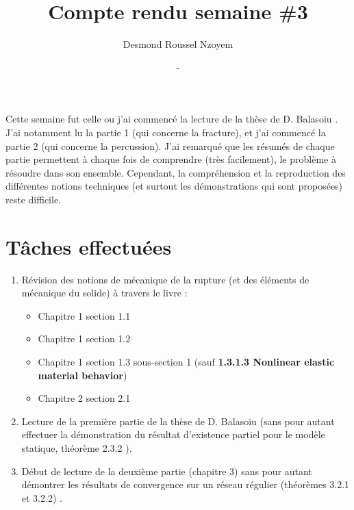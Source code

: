 \documentclass[
  french,
	11pt, %
]{fphw}
\title{Compte rendu semaine \#3} %
\author{Desmond Roussel Nzoyem} %
\date{\DTMdisplaydate{2021}{2}{17}{-1} - \DTMdisplaydate{2021}{2}{23}{-1}} %
\institute{Sorbonne Université \\ Laboratoire Jacques-Louis Lions} %
\begin{document}
\maketitle %



Cette semaine fut celle ou j'ai commencé la lecture de la thèse de D. Balasoiu \parencite{balasoiu2020thesis,balasoiu2020halthesis}. J'ai notamment lu la partie 1 (qui concerne la fracture), et j'ai commencé la partie 2 (qui concerne la percussion). J'ai remarqué que les résumés de chaque partie permettent à chaque fois de comprendre (très facilement), le problème à résoudre dans son ensemble. Cependant, la compréhension et la reproduction des différentes notions techniques (et surtout les démonstrations qui sont proposées) reste difficile.



\section{Tâches effectuées}

\begin{enumerate}
  \item Révision des notions de mécanique de la rupture (et des éléments de mécanique du solide) à travers le livre \parencite{gross2017fracture} :
  \begin{itemize}
    \item Chapitre 1 section 1.1
    \item Chapitre 1 section 1.2
    \item Chapitre 1 section 1.3 sous-section 1 (sauf \textbf{1.3.1.3 Nonlinear elastic material behavior})
    \item Chapitre 2 section 2.1
  \end{itemize}
  \item Lecture de la première partie de la thèse de D. Balasoiu (sans pour autant effectuer la démonstration du résultat d’existence partiel pour le modèle statique, théorème 2.3.2 \parencite[p.53]{balasoiu2020halthesis}).
  \item Début de lecture de la deuxième partie (chapitre 3) sans pour autant démontrer les résultats de convergence sur un réseau régulier (théorèmes 3.2.1 et 3.2.2) \parencite[pp.100-103]{balasoiu2020halthesis}.

\end{enumerate}
\end{document}
